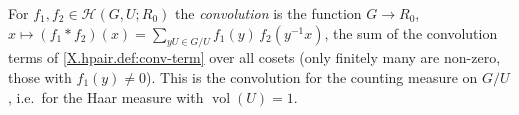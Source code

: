 For $f_1,f_2\in\mathcal H(G,U;R_0)$ the \emph{convolution} is the function $G\to R_0$, $x\mapsto (f_1*f_2)(x)=\sum_{yU\in G/U} f_1(y)\,f_2(y^{-1}x)$, the sum of the convolution terms of \cref{X.hpair.def:conv-term} over all cosets (only finitely many are non-zero, those with $f_1(y)\neq0$). This is the convolution for the counting measure on $G/U$, i.e.\ for the Haar measure with $\operatorname{vol}(U)=1$.
